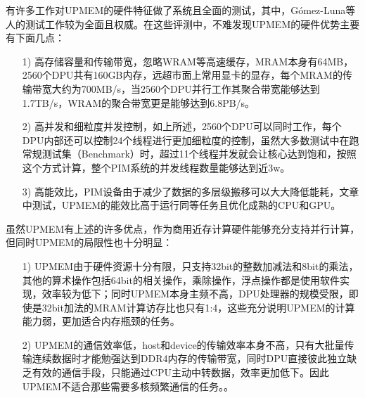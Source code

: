 有许多工作对UPMEM的硬件特征做了系统且全面的测试\cite{BenchmarkingMutlu,BenchmarkingGermany,BenchmarkingUBC,BenchmarkingUPMEM,uPimulator}，其中，Gómez-Luna等人\cite{BenchmarkingMutlu}的测试工作较为全面且权威。在这些评测中，不难发现UPMEM的硬件优势主要有下面几点：
\begin{itemize}
	\item [1)] 
	高存储容量和传输带宽，忽略WRAM等高速缓存，MRAM本身有64MB，2560个DPU共有160GB内存，远超市面上常用显卡的显存，每个MRAM的传输带宽大约为700MB/s，当2560个DPU并行工作其聚合带宽能够达到1.7TB/s，WRAM的聚合带宽更是能够达到6.8PB/s。      
	\item [2)]
	高并发和细粒度并发控制，如上所述，2560个DPU可以同时工作，每个DPU内部还可以控制24个线程进行更加细粒度的控制，虽然大多数测试中在跑常规测试集（Benchmark）时，超过11个线程并发就会让核心达到饱和，按照这个方式计算，整个PIM系统的并发线程数量能够达到近3w。
	\item [3)]
	高能效比，PIM设备由于减少了数据的多层级搬移可以大大降低能耗，文章\cite{BenchmarkingMutlu}中测试，UPMEM的能效比高于运行同等任务且优化成熟的CPU和GPU。
\end{itemize}

虽然UPMEM有上述的许多优点，作为商用近存计算硬件能够充分支持并行计算，但同时UPMEM的局限性也十分明显：
\begin{itemize}
	\item [1)] 
	UPMEM由于硬件资源十分有限，只支持32bit的整数加减法和8bit的乘法，其他的算术操作包括64bit的相关操作，乘除操作，浮点操作都是使用软件实现，效率较为低下；同时UPMEM本身主频不高，DPU处理器的规模受限，即使是32bit加法的MRAM计算访存比也只有1:4\cite{BenchmarkingMutlu}，这些充分说明UPMEM的计算能力弱，更加适合内存瓶颈的任务。
	\item [2)]
	UPMEM的通信效率低，host和device的传输效率本身不高，只有大批量传输连续数据时才能勉强达到DDR4内存的传输带宽，同时DPU直接彼此独立缺乏有效的通信手段，只能通过CPU主动中转数据，效率更加低下。因此UPMEM不适合那些需要多核频繁通信的任务。\cite{BenchmarkingMutlu}。
\end{itemize}

